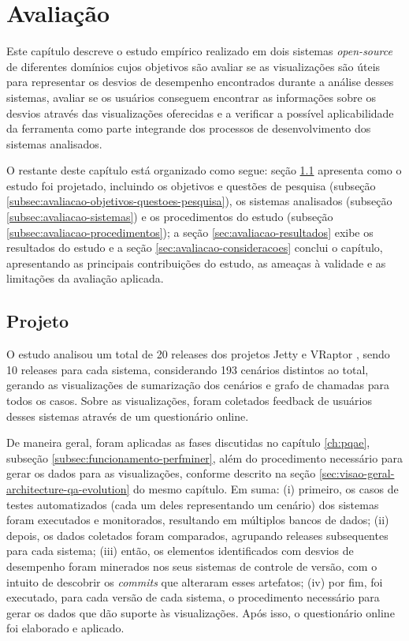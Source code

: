 \chapter{Avaliação} \label{ch:avaliacao}

Este capítulo descreve o estudo empírico realizado em dois sistemas \textit{open-source} de diferentes domínios cujos objetivos são avaliar se as visualizações são úteis para representar os desvios de desempenho encontrados durante a análise desses sistemas, avaliar se os usuários conseguem encontrar as informações sobre os desvios através das visualizações oferecidas e a verificar a possível aplicabilidade da ferramenta como parte integrande dos processos de desenvolvimento dos sistemas analisados.

O restante deste capítulo está organizado como segue: seção \ref{sec:avaliacao-projeto} apresenta como o estudo foi projetado, incluindo os objetivos e questões de pesquisa (subseção \ref{subsec:avaliacao-objetivos-questoes-pesquisa}), os sistemas analisados (subseção \ref{subsec:avaliacao-sistemas}) e os procedimentos do estudo (subseção \ref{subsec:avaliacao-procedimentos}); a seção \ref{sec:avaliacao-resultados} exibe os resultados do estudo e a seção \ref{sec:avaliacao-consideracoes} conclui o capítulo, apresentando as principais contribuições do estudo, as ameaças à validade e as limitações da avaliação aplicada.

\section{Projeto} \label{sec:avaliacao-projeto}

O estudo analisou um total de 20 releases dos projetos Jetty \cite{Jetty2016} e VRaptor \cite{VRaptor2017}, sendo 10 releases para cada sistema, considerando 193 cenários distintos ao total, gerando as visualizações de sumarização dos cenários e grafo de chamadas para todos os casos. Sobre as visualizações, foram coletados feedback de usuários desses sistemas através de um questionário online.

De maneira geral, foram aplicadas as fases discutidas no capítulo \ref{ch:pqae}, subseção \ref{subsec:funcionamento-perfminer}, além do procedimento necessário para gerar os dados para as visualizações, conforme descrito na seção \ref{sec:visao-geral-architecture-qa-evolution} do mesmo capítulo. Em suma: (i) primeiro, os casos de testes automatizados (cada um deles representando um cenário) dos sistemas foram executados e monitorados, resultando em múltiplos bancos de dados; (ii) depois, os dados coletados foram comparados, agrupando releases subsequentes para cada sistema; (iii) então, os elementos identificados com desvios de desempenho foram minerados nos seus sistemas de controle de versão, com o intuito de descobrir os \textit{commits} que alteraram esses artefatos; (iv) por fim, foi executado, para cada versão de cada sistema, o procedimento necessário para gerar os dados que dão suporte às visualizações. Após isso, o questionário online foi elaborado e aplicado.

